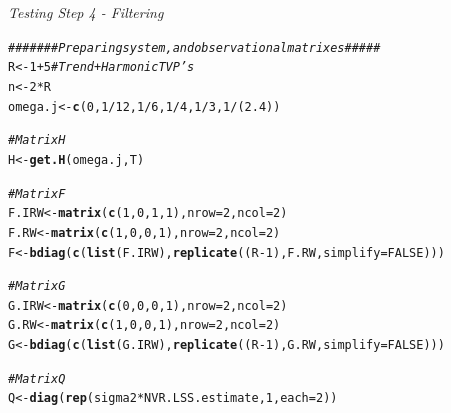 \documentclass{article}\usepackage[]{graphicx}\usepackage[]{color}
\makeatletter
\newcommand{\hlnum}[1]{\textcolor[rgb]{0.686,0.059,0.569}{#1}}%
\newcommand{\hlcom}[1]{\textcolor[rgb]{0.678,0.584,0.686}{\textit{#1}}}%
\newcommand{\hlopt}[1]{\textcolor[rgb]{0,0,0}{#1}}%
\newcommand{\hlstd}[1]{\textcolor[rgb]{0.345,0.345,0.345}{#1}}%
\newcommand{\hlkwb}[1]{\textcolor[rgb]{0.69,0.353,0.396}{#1}}%
\newcommand{\hlkwc}[1]{\textcolor[rgb]{0.333,0.667,0.333}{#1}}%
\newcommand{\hlkwd}[1]{\textcolor[rgb]{0.737,0.353,0.396}{\textbf{#1}}}%
\newenvironment{kframe}{%
 \def\at@end@of@kframe{}%
 \ifinner\ifhmode%
  \def\at@end@of@kframe{\end{minipage}}%
  \begin{minipage}{\columnwidth}%
 \fi\fi%
 \def\FrameCommand##1{\hskip\@totalleftmargin \hskip-\fboxsep
 \colorbox{shadecolor}{##1}\hskip-\fboxsep
     \hskip-\linewidth \hskip-\@totalleftmargin \hskip\columnwidth}%
 \MakeFramed {\advance\hsize-\width
   \@totalleftmargin\z@ \linewidth\hsize
   \@setminipage}}%
 {\par\unskip\endMakeFramed%
 \at@end@of@kframe}
\newenvironment{knitrout}{}{} %
\makeatother
\begin{document}
\vspace{0.2cm}
\textit{Testing Step 4 - Filtering}
\begin{knitrout}\footnotesize
{}\color{fgcolor}\begin{kframe}
\begin{alltt}
\hlcom{####### Preparing system, and observational matrixes #####}
\hlstd{R} \hlkwb{<-} \hlnum{1} \hlopt{+} \hlnum{5} \hlcom{# Trend + Harmonic TVP's}
\hlstd{n} \hlkwb{<-} \hlnum{2}\hlopt{*}\hlstd{R}
\hlstd{omega.j} \hlkwb{<-} \hlkwd{c}\hlstd{(}\hlnum{0}\hlstd{,} \hlnum{1}\hlopt{/}\hlnum{12}\hlstd{,} \hlnum{1}\hlopt{/}\hlnum{6}\hlstd{,} \hlnum{1}\hlopt{/}\hlnum{4}\hlstd{,} \hlnum{1}\hlopt{/}\hlnum{3}\hlstd{,} \hlnum{1}\hlopt{/}\hlstd{(}\hlnum{2.4}\hlstd{))}

\hlcom{# Matrix H}
\hlstd{H} \hlkwb{<-} \hlkwd{get.H}\hlstd{(omega.j, T)}

\hlcom{# Matrix F}
\hlstd{F.IRW} \hlkwb{<-} \hlkwd{matrix}\hlstd{(}\hlkwd{c}\hlstd{(}\hlnum{1}\hlstd{,} \hlnum{0}\hlstd{,} \hlnum{1}\hlstd{,} \hlnum{1}\hlstd{),} \hlkwc{nrow} \hlstd{=} \hlnum{2}\hlstd{,} \hlkwc{ncol} \hlstd{=} \hlnum{2}\hlstd{)}
\hlstd{F.RW} \hlkwb{<-} \hlkwd{matrix}\hlstd{(}\hlkwd{c}\hlstd{(}\hlnum{1}\hlstd{,} \hlnum{0}\hlstd{,} \hlnum{0}\hlstd{,} \hlnum{1}\hlstd{),} \hlkwc{nrow} \hlstd{=} \hlnum{2}\hlstd{,} \hlkwc{ncol} \hlstd{=} \hlnum{2}\hlstd{)}
\hlstd{F} \hlkwb{<-} \hlkwd{bdiag}\hlstd{(}\hlkwd{c}\hlstd{(}\hlkwd{list}\hlstd{(F.IRW),} \hlkwd{replicate}\hlstd{((R} \hlopt{-} \hlnum{1}\hlstd{), F.RW,} \hlkwc{simplify} \hlstd{=} \hlnum{FALSE}\hlstd{)))}

\hlcom{# Matrix G}
\hlstd{G.IRW} \hlkwb{<-} \hlkwd{matrix}\hlstd{(}\hlkwd{c}\hlstd{(}\hlnum{0}\hlstd{,} \hlnum{0}\hlstd{,} \hlnum{0}\hlstd{,} \hlnum{1}\hlstd{),} \hlkwc{nrow} \hlstd{=} \hlnum{2}\hlstd{,} \hlkwc{ncol} \hlstd{=} \hlnum{2}\hlstd{)}
\hlstd{G.RW} \hlkwb{<-} \hlkwd{matrix}\hlstd{(}\hlkwd{c}\hlstd{(}\hlnum{1}\hlstd{,} \hlnum{0}\hlstd{,} \hlnum{0}\hlstd{,} \hlnum{1}\hlstd{),} \hlkwc{nrow} \hlstd{=} \hlnum{2}\hlstd{,} \hlkwc{ncol} \hlstd{=} \hlnum{2}\hlstd{)}
\hlstd{G} \hlkwb{<-} \hlkwd{bdiag}\hlstd{(}\hlkwd{c}\hlstd{(}\hlkwd{list}\hlstd{(G.IRW),} \hlkwd{replicate}\hlstd{((R} \hlopt{-} \hlnum{1}\hlstd{), G.RW,} \hlkwc{simplify} \hlstd{=} \hlnum{FALSE}\hlstd{)))}

\hlcom{# Matrix Q}
\hlstd{Q} \hlkwb{<-} \hlkwd{diag}\hlstd{(}\hlkwd{rep}\hlstd{(sigma2} \hlopt{*} \hlstd{NVR.LSS.estimate,} \hlnum{1}\hlstd{,} \hlkwc{each} \hlstd{=} \hlnum{2}\hlstd{))}




\end{alltt}
\end{kframe}
\end{knitrout}
\end{document}
